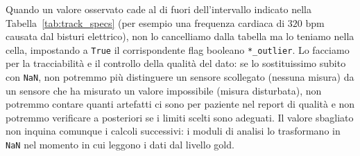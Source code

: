 \begin{table}[ht]
\centering
{}
\caption{Intervalli di validit\`a fisiologica definiti in \texttt{TRACK\_SPECS} e relativi flag associati nel livello silver.}
\label{tab:track_specs}
\end{table}

Quando un valore osservato cade al di fuori dell'intervallo indicato nella Tabella~\ref{tab:track_specs} (per esempio una frequenza cardiaca di $320\text{ bpm}$ causata dal bisturi elettrico), non lo cancelliamo dalla tabella ma lo teniamo nella cella, impostando a \texttt{True} il corrispondente flag booleano \texttt{*\_outlier}. Lo facciamo per la tracciabilit\`a e il controllo della qualit\`a del dato: se lo sostituissimo subito con \texttt{NaN}, non potremmo pi\`u distinguere un sensore scollegato (nessuna misura) da un sensore che ha misurato un valore impossibile (misura disturbata), non potremmo contare quanti artefatti ci sono per paziente nel report di qualit\`a e non potremmo verificare a posteriori se i limiti scelti sono adeguati. Il valore sbagliato non inquina comunque i calcoli successivi: i moduli di analisi lo trasformano in \texttt{NaN} nel momento in cui leggono i dati dal livello gold.

